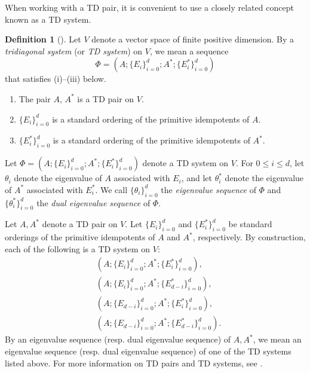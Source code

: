 \documentclass[11pt]{article}%
\theoremstyle{definition}
\newtheorem{definition}{Definition}[section]
\theoremstyle{plain}
\begin{document}
\smallskip
When working with a TD pair, it is convenient to use a closely related concept known as a TD system.

\begin{definition}[{\cite[Definition~2.1]{ITT2001}}]\label{def:TDsystem}
Let $V$ denote a vector space of finite positive dimension. 
By a \emph{tridiagonal system} (or \emph{TD system}) on $V$, we mean a sequence 
\begin{equation*}
	\Phi = ( A; \{ E_i \}_{i=0}^d; A^*; \{ E_i^* \}_{i=0}^{d} )
\end{equation*}
that satisfies (i)--(iii) below.
\begin{enumerate}[label=(\roman*),font=\rm,itemsep=0mm]
	\item The pair $A$, $A^*$ is a TD pair on $V$. 
	\item $\{E_i\}_{i=0}^d$ is a standard ordering of the primitive idempotents of $A$. 
	\item $\{E^*_i\}_{i=0}^d$ is a standard ordering of the primitive idempotents of $A^*$.
\end{enumerate}
\end{definition}

Let $\Phi=(A;\{E_i\}_{i=0}^d;A^*;\{E_i^*\}_{i=0}^d)$ denote a TD system on $V$.
For $0\leq i\leq d$, let $\theta_i$ denote the eigenvalue of $A$ associated with $E_i$, and let $\theta_i^*$ denote the eigenvalue of $A^*$ associated with $E_i^*$.
We call $\{\theta_i\}_{i=0}^d$ the \emph{eigenvalue sequence} of $\Phi$ and $\{\theta_i^*\}_{i=0}^d$ the \emph{dual eigenvalue sequence} of $\Phi$.

\smallskip
Let $A, A^*$ denote a TD pair on $V$.
Let $\{E_i\}_{i=0}^d$ and $\{E_i^*\}_{i=0}^d$ be standard orderings of the primitive idempotents of $A$ and $A^*$, respectively.
By construction, each of the following is a TD system on $V$:
\begin{align*}
	& ( A; \{ E_i \}_{i=0}^d; A^*; \{ E_i^* \}_{i=0}^{d} ), \\
	& ( A; \{ E_i \}_{i=0}^d; A^*; \{ E_{d-i}^* \}_{i=0}^{d} ), \\
	& ( A; \{ E_{d-i} \}_{i=0}^d; A^*; \{ E_i^* \}_{i=0}^{d} ), \\
	& ( A; \{ E_{d-i} \}_{i=0}^d; A^*; \{ E_{d-i}^* \}_{i=0}^{d} ).
\end{align*}
By an eigenvalue sequence (resp. dual eigenvalue sequence) of $A, A^*$, we mean an eigenvalue sequence (resp. dual eigenvalue sequence) of one of the TD systems listed above.
For more information on TD pairs and TD systems, see \cite{ITT2001, INP2011LAA, IT2004JPAA, IT2007RJ, IT2007LAA, NT2007LAA, NT2008LAA2, NT2008LAA}.
\end{document}
